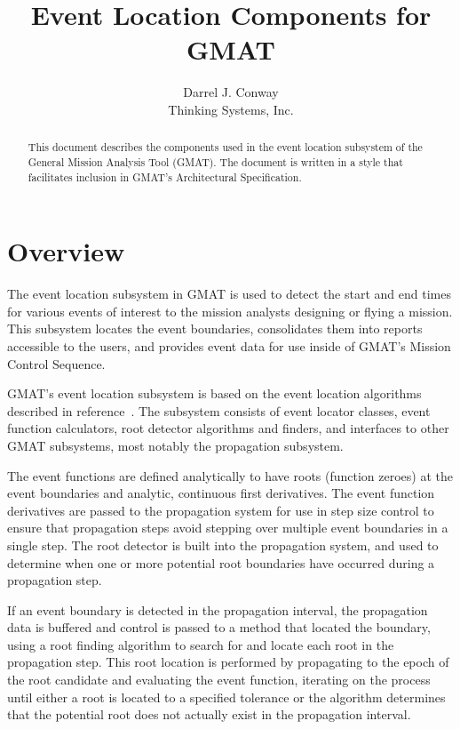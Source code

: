 \documentclass[letterpaper,10pt]{article}
\title{Event Location Components for GMAT}
\author{Darrel J. Conway\\\emph\small{{Thinking Systems, Inc.}}}
\begin{document}
\maketitle

\begin{abstract}
This document describes the components used in the event location subsystem of
the General Mission Analysis Tool (GMAT).  The document is written in a style
that facilitates inclusion in GMAT's Architectural Specification.
\end{abstract}

\section{Overview}

The event location subsystem in GMAT is used to detect the start and end times
for various events of interest to the mission analysts designing or flying a
mission.  This subsystem locates the event boundaries, consolidates them into
reports accessible to the users, and provides event data for use inside of
GMAT's Mission Control Sequence.

GMAT's event location subsystem is based on the event location algorithms
described in reference~\cite{pip}.  The subsystem consists of event locator
classes, event function calculators, root detector algorithms and finders, and
interfaces to other GMAT subsystems, most notably the propagation subsystem.  

The event functions are defined analytically to have roots (function zeroes) at
the event boundaries and analytic, continuous first derivatives.  The event
function derivatives are passed to the propagation system for use in step
size control to ensure that propagation steps avoid stepping over multiple
event boundaries in a single step.  The root detector is built into the
propagation system, and used to determine when one or more potential root
boundaries have occurred during a propagation step.  

If an event boundary is detected in the propagation interval, the propagation
data is buffered and control is passed to a method that located the boundary,
using a root finding algorithm to search for and locate each root in the
propagation step. This root location is performed by propagating to the epoch of
the root candidate and evaluating the event function, iterating on the process
until either a root is located to a specified tolerance or the algorithm
determines that the potential root does not actually exist in the propagation
interval.
\end{document}
